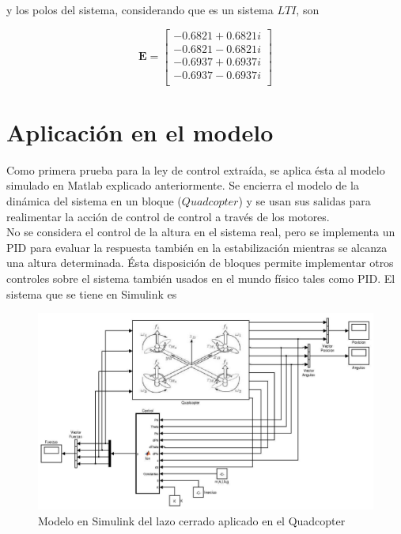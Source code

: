 \documentclass[twoside,11pt]{book}
\begin{document}
y los polos del sistema, considerando que es un sistema $LTI$, son

\begin{equation}
\mathbf{E}= \left[ \begin{array}{c}
  -0.6821 + 0.6821i \\
  -0.6821 - 0.6821i \\
  -0.6937 + 0.6937i \\
  -0.6937 - 0.6937i \\
\end{array} \right] 
\end{equation}

\section{Aplicación en el modelo}

Como primera prueba para la ley de control extraída, se aplica ésta al modelo simulado en Matlab explicado anteriormente. Se encierra el modelo de la dinámica del sistema en un bloque ($Quadcopter$) y se usan sus salidas para realimentar la acción de control de control a través de los motores. \\

No se considera el control de la altura en el sistema real, pero se implementa un PID para evaluar la respuesta también en la estabilización mientras se alcanza una altura determinada. Ésta disposición de bloques permite implementar otros controles sobre el sistema también usados en el mundo físico tales como PID. El sistema que se tiene en Simulink es

\newpage

\begin{center}
\begin{figure}[h!]
\includegraphics[scale=0.43,bb=0 0 650 600]{images/Simulink_model_2.png}
\caption{Modelo en Simulink del lazo cerrado aplicado en el Quadcopter}
\end{figure}
\end{center}
\end{document}
